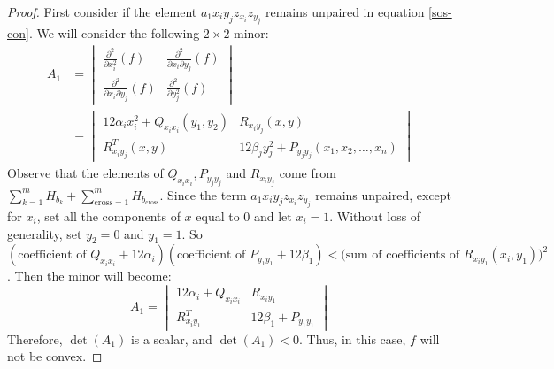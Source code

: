 \documentclass[12pt]{elsarticle}
\theoremstyle{definition}
\begin{document}
\begin{proof}
First consider if the element $a_1x_iy_jz_{x_i}z_{y_j}$ remains unpaired in equation \eqref{sos-con}. We will consider the following $2\times 2$ minor:
\[
\begin{aligned}
A_1&=\begin{vmatrix}
    \frac{\partial^2}{\partial x_i^2}(f) & \frac{\partial^2}{\partial x_i \partial y_j}(f)\\
    \frac{\partial^2}{\partial x_i \partial y_j}(f) & \frac{\partial^2}{\partial y_j^2}(f)
\end{vmatrix}\\
& = \begin{vmatrix}
    12\alpha_i x_i^2 + Q_{x_{i}x_{i}}(y_1,y_2) & R_{x_{i}y_{j}}(x,y)\\
    R_{x_{i}y_{j}}^T(x,y) & 12\beta_j y_j^2 + P_{y_{j}y_{j}}(x_1,x_2,\dots,x_n)
\end{vmatrix}
\end{aligned}
\]
Observe that the elements of $Q_{x_{i}x_{i}}, P_{y_{j}y_{j}}$ and $R_{x_{i}y_{j}}$ come from $\sum_{k=1}^m H_{b_k} + \sum_{\text{cross}=1}^m H_{b_{\text{cross}}}$. Since the term $a_1x_iy_jz_{x_i}z_{y_j}$ remains unpaired, except for $x_i$, set all the components of $x$ equal to $0$ and let $x_i=1$. Without loss of generality, set $y_2 =0$ and $y_1=1$. So $(\text{coefficient of } Q_{x_i x_i} +12\alpha_i)(\text{coefficient of } P_{y_1 y_1} +12\beta_1) < \big(\text{sum of coefficients of } R_{x_i y_1}(x_i,y_1)\big)^2$. Then the minor will become:
\[
A_1=\begin{vmatrix}
     12\alpha_i  + Q_{x_{i}x_{i}} & R_{x_{i}y_{1}}\\
     R_{x_{i}y_{1}}^T & 12\beta_1 + P_{y_{1}y_{1}}
\end{vmatrix}
\]
Therefore, $\det(A_1)$ is a scalar, and $\det(A_1) < 0$. Thus, in this case, $f$ will not be convex.


\end{proof}
\end{document}
